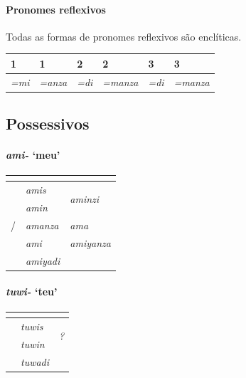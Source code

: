 \paragraph{Pronomes reflexivos}
Todas as formas de pronomes reflexivos são enclíticas.

\begin{center}
	\begin{tabular}[c]{llllll}
		\toprule
		1\Sg{}\emph{} & 1\Pl{}\emph{} & 2\Sg{}\emph{} & 2\Pl{}\emph{} & 3\Sg{}\emph{} & 3\Pl{}\emph{} \\
		\midrule
		\emph{=mi}    & \emph{=anza}  & \emph{=di}    & \emph{=manza} & \emph{=di}    & \emph{=manza} \\
		\bottomrule
	\end{tabular}
\end{center}

\subsection{Possessivos}

\paragraph{\emph{ami-} `meu'}

\begin{center}
	\begin{tabular}[c]{lll}
		\toprule
		                      & \Sg{}\emph{}   & \Pl{}\emph{}                     \\
		\midrule
		\Nom{} \Com{}         & \emph{amis}    & \multirow{2}{4em}{\emph{aminzi}} \\
		\Acu{} \Com{}         & \emph{amin}    &                                  \\
		\Nom{}/\Acu{} \Neut{} & \emph{amanza}  & \emph{ama}                       \\
		\Dat{}                & \emph{ami}     & \emph{amiyanza}                  \\
		\Abl{}                & \emph{amiyadi} & \emph{}                          \\
		\bottomrule
	\end{tabular}
\end{center}

\clearpage
\paragraph{\emph{tuwi-} `teu'}
\begin{center}
	\begin{tabular}[c]{lll}
		\toprule
		              & \Sg{}\emph{}  & \Pl{}\emph{}                \\
		\midrule
		\Nom{} \Com{} & \emph{tuwis}  & \multirow{2}{4em}{\emph{?}} \\
		\Acu{} \Com{} & \emph{tuwin}  &                             \\
		\Abl{}        & \emph{tuwadi} & \emph{}                     \\
		\bottomrule
	\end{tabular}
\end{center}

